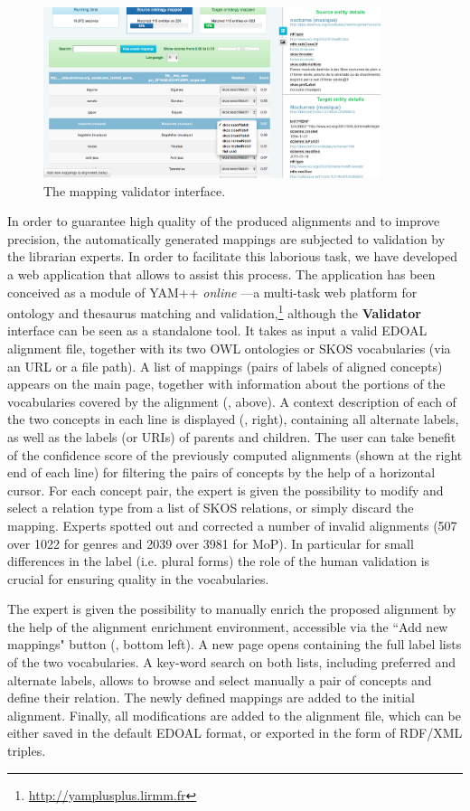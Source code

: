 \documentclass{article}
\begin{document}
\begin{figure}
	\centering
		\includegraphics[height=5cm]{figs/screen2.png}
	\caption{The mapping validator interface.}
	\label{fig:screen2}
\end{figure}

In order to guarantee high quality of the produced alignments and to improve precision, the automatically generated mappings are subjected to validation by the librarian experts. In order to facilitate this laborious task, we have developed a web application that allows to assist this process. The application has been conceived as a module of YAM++ {\it online} \cite{bellahsene2017yam++}---a multi-task web platform for ontology and thesaurus matching and validation,\footnote{
\url{http://yamplusplus.lirmm.fr}
} although the {\bf Validator} interface can be seen as a standalone tool. It takes as input a valid EDOAL alignment file, together with its two OWL ontologies or SKOS vocabularies (via an URL or a file path). A list of mappings (pairs of labels of aligned concepts) appears on the main page, together with information about the portions of the vocabularies covered by the alignment (, above). A context description of each of the two concepts in each line is displayed (, right), containing all alternate labels, as well as the labels (or URIs) of parents and children. The user can take benefit of the confidence score of the previously computed alignments (shown at the right end of each line) for filtering the pairs of concepts by the help of a horizontal cursor. For each concept pair, the expert is given the possibility to modify and select a relation type from a list of SKOS relations, or simply discard the mapping. Experts spotted out and corrected a number of invalid alignments (507 over 1022 for genres and 2039 over 3981 for MoP). In particular for small differences in the label (i.e. plural forms) the role of the human validation is crucial for ensuring quality in the vocabularies.

The expert is given the possibility to manually enrich the proposed alignment by the help of the alignment enrichment environment, accessible via the ``Add new mappings" button (, bottom left). A new page opens containing the full label lists of the two vocabularies. A key-word search on both lists, including preferred and alternate labels, allows to browse and select manually a pair of concepts and define their relation. The newly defined mappings are added to the initial alignment. Finally, all modifications are added to the alignment file, which can be either saved in the default EDOAL format, or exported in the form of RDF/XML triples.
\end{document}
